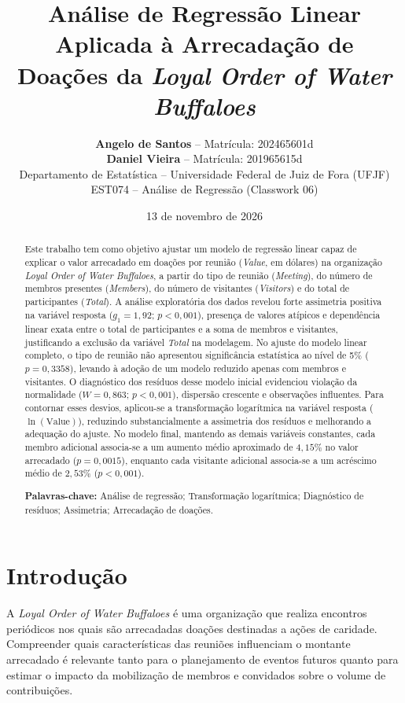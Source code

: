 \documentclass[11pt,a4paper]{article}
\title{\textbf{Análise de Regressão Linear Aplicada à Arrecadação de Doações da \textit{Loyal Order of Water Buffaloes}}}
\author{
  \textbf{Angelo de Santos} -- Matrícula: 202465601d \\
  \textbf{Daniel Vieira} -- Matrícula: 201965615d \\
  \small Departamento de Estatística -- Universidade Federal de Juiz de Fora (UFJF) \\
  \small EST074 -- Análise de Regressão (Classwork 06)
}
\date{13 de novembro de 2026}
\begin{document}
\maketitle

\begin{abstract}
Este trabalho tem como objetivo ajustar um modelo de regressão linear capaz de explicar o valor arrecadado em doações por reunião (\textit{Value}, em dólares) na organização \textit{Loyal Order of Water Buffaloes}, a partir do tipo de reunião (\textit{Meeting}), do número de membros presentes (\textit{Members}), do número de visitantes (\textit{Visitors}) e do total de participantes (\textit{Total}). A análise exploratória dos dados revelou forte assimetria positiva na variável resposta ($g_1 = 1{,}92$; $p < 0{,}001$), presença de valores atípicos e dependência linear exata entre o total de participantes e a soma de membros e visitantes, justificando a exclusão da variável \textit{Total} na modelagem. No ajuste do modelo linear completo, o tipo de reunião não apresentou significância estatística ao nível de 5\% ($p = 0{,}3358$), levando à adoção de um modelo reduzido apenas com membros e visitantes. O diagnóstico dos resíduos desse modelo inicial evidenciou violação da normalidade ($W = 0{,}863$; $p < 0{,}001$), dispersão crescente e observações influentes. Para contornar esses desvios, aplicou-se a transformação logarítmica na variável resposta ($\ln(\text{Value})$), reduzindo substancialmente a assimetria dos resíduos e melhorando a adequação do ajuste. No modelo final, mantendo as demais variáveis constantes, cada membro adicional associa-se a um aumento médio aproximado de $4{,}15\%$ no valor arrecadado ($p = 0{,}0015$), enquanto cada visitante adicional associa-se a um acréscimo médio de $2{,}53\%$ ($p < 0{,}001$).

\vspace{0.2cm}
\noindent\textbf{Palavras-chave:} Análise de regressão; Transformação logarítmica; Diagnóstico de resíduos; Assimetria; Arrecadação de doações.
\end{abstract}

\section{Introdução}

A \textit{Loyal Order of Water Buffaloes} é uma organização que realiza encontros periódicos nos quais são arrecadadas doações destinadas a ações de caridade. Compreender quais características das reuniões influenciam o montante arrecadado é relevante tanto para o planejamento de eventos futuros quanto para estimar o impacto da mobilização de membros e convidados sobre o volume de contribuições.
\end{document}
